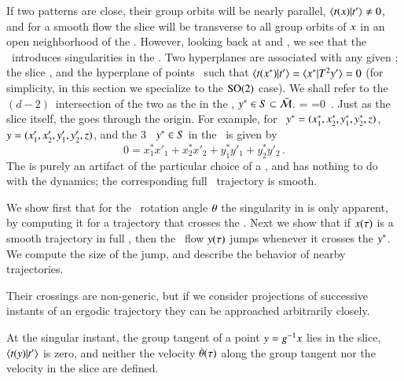 

If  two patterns are close, their group orbits will be nearly parallel,
$\braket{\groupTan(\ssp)}{\sliceTan{}} \neq 0$, and for a smooth flow the
slice will be transverse to all group orbits of $x$ in an open
neighborhood of the {\template} \slicep. However, looking back at
 and , we see that the
\mslices\ introduces singularities in the \reducedsp. Two hyperplanes are
associated with  any given {\template} \slicep; the slice ,
and the hyperplane of points \sspSing\ such that
\( %
\braket{\groupTan(\sspSing)}{\sliceTan{}}
 =
\braket{\sspSing}{\Lg^2\slicep}
 =0
\) %
(for simplicity, in this section we specialize to the  $\textrm{SO}(2)$ case).
We shall refer to the $(d\!-\!2)$\dmn\ intersection of the two as
the {\em \sset} in the \reducedsp, $y^* \in S \subset \bar{\cal M}$.
\beq
\braket{\groupTan(\sspRSing)}{\sliceTan{}}
 =
\braket{\sspRSing}{\Lg^2\slicep}
 =0
\,.
Just as the slice itself, the {\em \sset} goes through the origin.
For example, for \cLe\
$\sspRSing = (x_1^*,x_2^*,y_1^*,y_2^*,z)$,
$\sspRed = (x_1',x_2',y_1',y_2',z)$,
and the 3\dmn\ {\sset} $\sspRSing \in S$ in the \reducedsp\ is given by
\[
0 = {x_1^* x'_1+x_2^* x'_2+y_1^* y'_1+y_2^* y'_2}
\,.
\]
The {\sset} is purely an artifact of the particular choice of a
{\template}, and has nothing to do with the dynamics; the corresponding full
\statesp\ trajectory is smooth.

We show first that for the \mframes\ rotation angle ${\bf \theta}$ the
singularity in \refeq{SL:CLEsliceRot} is only apparent, by computing it
for a trajectory that crosses the {\sset}. Next we show that if
$x(\tau)$ is a smooth trajectory in full {\statesp}, then the
\reducedsp\ flow $y(\tau)$ jumps whenever it crosses the {\sset}
$y^*$. We compute the size of the jump, and describe the behavior of nearby
trajectories.


Their crossings are
non-generic, but if we consider projections of successive instants of an
ergodic trajectory they can be approached arbitrarily closely.

At the
singular instant, the group tangent of a point $y=g^{-1} x$
lies in the slice, $\braket{\groupTan(\sspRed)}{\sliceTan{}}$ is zero,
and neither the velocity $\dot{{\bf \theta}}(\tau)$ along the group tangent
nor the velocity in the slice are defined.

